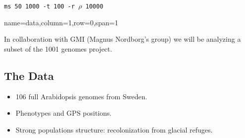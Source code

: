 \documentclass[portrait,final]{baposter}
\begin{document}
\begin{poster}
{{\tt ms 50 1000 -t 100 -r $\rho$ 10000}

\vspace{0.4em}
}



{name=data,column=1,row=0,span=1}{ 
\begin{center}
\end{center}
\vspace{-.3cm}
In collaboration with GMI (Magnus Nordborg's group) we will be analyzing a
subset of the 1001 genomes project. 
\begin{center}
 \section*{The Data}
\end{center}
\begin{itemize}
  \item 106 full Arabidopsis genomes from Sweden.
  \item Phenotypes and GPS positions.
  \item Strong populations structure: recolonization from glacial refuges.
\end{itemize}

}
\end{poster}
\end{document}
